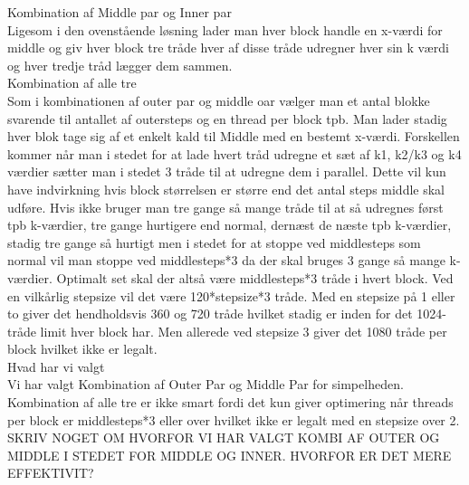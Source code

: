 Kombination af Middle par og Inner par\\
Ligesom i den ovenstående løsning lader man hver block handle en x-værdi for middle og giv hver block tre tråde hver af disse tråde udregner hver sin k værdi og hver tredje tråd lægger dem sammen.\\

Kombination af alle tre\\
Som i kombinationen af outer par og middle oar vælger man et antal blokke svarende til antallet af outersteps og en thread per block tpb. Man lader stadig hver blok tage sig af et enkelt kald til Middle med en bestemt x-værdi. Forskellen kommer når man i stedet for at lade hvert tråd udregne et sæt af k1, k2/k3 og k4 værdier sætter man i stedet 3 tråde til at udregne dem i parallel. Dette vil kun have indvirkning hvis block størrelsen er større end det antal steps middle skal udføre. Hvis ikke  bruger man tre gange så mange tråde til at så udregnes først tpb k-værdier, tre gange hurtigere end normal, dernæst de næste tpb k-værdier, stadig tre gange så hurtigt men i stedet for at stoppe ved middlesteps som normal vil man stoppe ved middlesteps*3 da der skal bruges 3 gange så mange k-værdier. Optimalt set skal der altså være middlesteps*3 tråde i hvert block. Ved en vilkårlig stepsize vil det være 120*stepsize*3 tråde. Med en stepsize på 1 eller to giver det hendholdsvis 360 og 720 tråde hvilket stadig er inden for det 1024-tråde limit hver block har. Men allerede ved stepsize 3 giver det 1080 tråde per block hvilket ikke er legalt.\\

Hvad har vi valgt\\
Vi har valgt Kombination af Outer Par og Middle Par for simpelheden.
Kombination af alle tre er ikke smart fordi det kun giver optimering når threads per block er middlesteps*3 eller over hvilket ikke er legalt med en stepsize over 2.
SKRIV NOGET OM HVORFOR VI HAR VALGT KOMBI AF OUTER OG MIDDLE I STEDET FOR MIDDLE OG INNER. HVORFOR ER DET MERE EFFEKTIVIT?